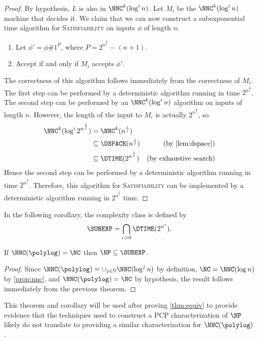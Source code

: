 \documentclass{article}
\begin{document}
\begin{proof}
  By hypothesis, $L$ is also in $\NNC^k(\log^i n)$.
  Let $M_i$ be the $\NNC^k(\log^i n)$ machine that decides it.
  We claim that we can now construct a subexponential time algorithm for \textsc{Satisfiability} on inputs $\phi$ of length $n$.
  \begin{enumerate}
  \item Let $\phi' = \phi \# 1^P$, where $P = 2^{n^{\frac{1}{j}}} - (n + 1)$.
  \item Accept if and only if $M_i$ accepts $\phi'$.
  \end{enumerate}
  The correctness of this algorithm follows immediately from the correctness of $M_i$.
  The first step can be performed by a deterministic algorithm running in time $2^{n^{\frac{1}{j}}}$.
  The second step can be performed by an $\NNC^k(\log^i n)$ algorithm on inputs of length $n$.
  However, the length of the input to $M_i$ is actually $2^{n^{\frac{1}{j}}}$, so
  \begin{align*}
    \NNC^k(\log^i{2^{n^{\frac{1}{j}}}}) & = \NNC^k(n^{\frac{i}{j}}) & \\
    & \subseteq \DSPACE(n^{\frac{i}{j}}) & \text{(by \autoref{lem:dspace})} \\
    & \subseteq \DTIME(2^{n^{\frac{i}{j}}}) & \text{(by exhaustive search)}
  \end{align*}
  Hence the second step can be performed by a deterministic algorithm running in time $2^{n^{\frac{i}{j}}}$.
  Therefore, this algorithm for \textsc{Satisfiability} can be implemented by a deterministic algorithm running in $2^{n^{\frac{i}{j}}}$ time.
\end{proof}

In the following corollary, the complexity class \SUBEXP{} is defined by
\begin{equation*}
  \SUBEXP = \bigcap_{\epsilon > 0}{\DTIME(2^{n^{\epsilon}})}.
\end{equation*}

\begin{corollary}\label{cor:collapse}
  If $\NNC(\polylog) = \NC$ then $\NP \subseteq \SUBEXP$.
\end{corollary}
\begin{proof}
  Since $\NNC(\polylog) = \cup_{j \in \mathbb{N}}{\NNC(\log^j n)}$ by definition, $\NC = \NNC(\log n)$ by \autoref{prop:nnc}, and $\NNC(\polylog) = \NC$ by hypothesis, the result follows immediately from the previous theorem.
\end{proof}

This theorem and corollary will be used after proving \autoref{thm:equiv} to provide evidence that the techniques used to construct a PCP characterization of $\NP$ likely do not translate to providing a similar characterization for $\NNC(\polylog)$.
\end{document}

